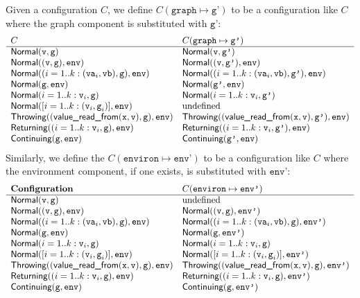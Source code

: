 \documentclass{book}
\newcommand\withgraph[2]{{#1}(\texttt{graph}\mapsto{#2})}
\newcommand\withenviron[2]{{#1}(\texttt{environ}\mapsto{#2})}
\newcommand\valuereadfrom[0]{\textsf{value\_read\_from}}
\newcommand\Normal[0]{\textsf{Normal}}
\newcommand\Throwing[0]{\textsf{Throwing}}
\newcommand\Continuing[0]{\textsf{Continuing}}
\newcommand\Returning[0]{\textsf{Returning}}
\newcommand\env[0]{\texttt{env}}
\newcommand\envp[0]{\texttt{env'}}
\newcommand\vg[0]{\texttt{g}}
\newcommand\vgp[0]{\texttt{g'}}
\newcommand\vv[0]{\texttt{v}}
\begin{document}
Given a configuration $C$, we define $\withgraph{C}{\vgp}$ to be a configuration
like $C$ where the graph component is substituted with $\vgp$:
\[
\begin{array}{ll}
  C & \withgraph{C}{\vgp}\\
  \hline
  \Normal(\vv,\vg) & \Normal(\vv,\vgp)\\
  \Normal((\vv,\vg), \env) & \Normal((\vv,\vgp), \env)\\
  \Normal((i=1..k: (\texttt{va}_i,\texttt{vb}),\vg), \env) & \Normal((i=1..k: (\texttt{va}_i,\texttt{vb}),\vgp), \env)\\
  \Normal(\vg, \env) & \Normal(\vgp, \env)\\
  \Normal(i=1..k: \vv_i, \vg) & \Normal(i=1..k: \vv_i, \vgp)\\
  \Normal([i=1..k: (\vv_i,\vg_i)], \env) & \text{undefined}\\
  \Throwing((\valuereadfrom(\vx,\vv),\vg), \env) & \Throwing((\valuereadfrom(\vx,\vv),\vgp), \env)\\
  \Returning((i=1..k: \vv_i,\vg), \env) & \Returning((i=1..k: \vv_i,\vgp), \env)\\
  \Continuing(\vg, \env) & \Continuing(\vgp, \env)\\
\end{array}
\]
Similarly, we define the $\withenviron{C}{\envp}$ to be a configuration
like $C$ where the environment component, if one exists, is substituted with $\envp$:
\[
\begin{array}{ll}
  \textbf{Configuration} & \withenviron{C}{\envp}\\
  \hline
  \Normal(\vv,\vg) & \text{undefined}\\
  \Normal((\vv,\vg), \env) & \Normal((\vv,\vg), \envp)\\
  \Normal((i=1..k: (\texttt{va}_i,\texttt{vb}),\vg), \env) & \Normal((i=1..k: (\texttt{va}_i,\texttt{vb}),\vg), \envp)\\
  \Normal(\vg, \env) & \Normal(\vg, \envp)\\
  \Normal(i=1..k: \vv_i, \vg) & \Normal(i=1..k: \vv_i, \vg)\\
  \Normal([i=1..k: (\vv_i,\vg_i)], \env) & \Normal([i=1..k: (\vv_i,\vg_i)], \envp)\\
  \Throwing((\valuereadfrom(\vx,\vv),\vg), \env) & \Throwing((\valuereadfrom(\vx,\vv),\vg), \envp)\\
  \Returning((i=1..k: \vv_i,\vg), \env) & \Returning((i=1..k: \vv_i,\vg), \envp)\\
  \Continuing(\vg, \env) & \Continuing(\vg, \envp)\\
\end{array}
\]
\end{document}

